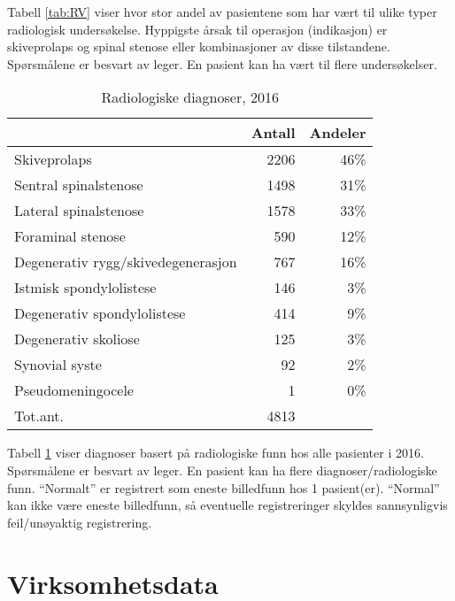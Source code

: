 Tabell \ref{tab:RV} viser hvor stor andel av pasientene som har vært til ulike typer 
radiologisk undersøkelse. Hyppigste årsak til operasjon (indikasjon) er skiveprolaps og spinal stenose eller kombinasjoner av disse tilstandene.
Spørsmålene er besvart av leger. En pasient kan ha vært til flere undersøkelser.




\begin{table}[ht]
\centering
\begin{tabular}{lrr}
  \hline
 & Antall & Andeler \\ 
  \hline
Skiveprolaps & 2206 & 46\% \\ 
  Sentral spinalstenose & 1498 & 31\% \\ 
  Lateral spinalstenose & 1578 & 33\% \\ 
  Foraminal stenose & 590 & 12\% \\ 
  Degenerativ rygg/skivedegenerasjon & 767 & 16\% \\ 
  Istmisk spondylolistese & 146 & 3\% \\ 
  Degenerativ spondylolistese & 414 & 9\% \\ 
  Degenerativ skoliose & 125 & 3\% \\ 
  Synovial syste & 92 & 2\% \\ 
  Pseudomeningocele & 1 & 0\% \\ 
  Tot.ant. & 4813 &   \\ 
   \hline
\end{tabular}
\caption{Radiologiske diagnoser, 2016} 
\label{tab:RF}
\end{table}


Tabell \ref{tab:RF} viser diagnoser basert på radiologiske funn hos alle pasienter 
i 2016. 
Spørsmålene er besvart av leger.
En pasient kan ha flere diagnoser/radiologiske funn.
``Normalt'' er registrert som eneste billedfunn hos 1 pasient(er).
                                  ``Normal'' kan ikke være eneste billedfunn, så eventuelle registreringer skyldes sannsynligvis 
                                  feil/unøyaktig registrering.










\clearpage

\section{Virksomhetsdata}


